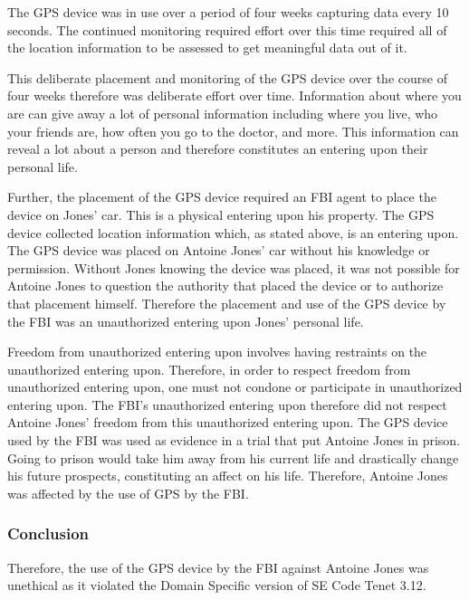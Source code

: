 \documentclass[12pt]{article}
\newcounter{subsubsubsection}[subsubsection]
\begin{document}
\begin{multicols}{2}
The GPS device was in use over a period of four weeks capturing data every 10 seconds. \cite{effjones} 
The continued monitoring required effort over this time required all of the location information to be assessed to get meaningful data out of it.

This deliberate placement and monitoring of the GPS device over the course of four weeks therefore was deliberate effort over time.
Information about where you are can give away a lot of personal information including where you live, who your friends are, how often you go to the doctor, and more. \cite{aclu_privacy}
This information can reveal a lot about a person and therefore constitutes an entering upon their personal life.

Further, the placement of the GPS device required an FBI agent to place the device on Jones' car. \cite{usvjonesopinions} This is a physical entering upon his property.
The GPS device collected location information which, as stated above, is an entering upon.
The GPS device was placed on Antoine Jones' car without his knowledge or permission. \cite{usvjonesopinions}
Without Jones knowing the device was placed, it was not possible for Antoine Jones to question the authority that placed the device or to authorize that placement himself.
Therefore the placement and use of the GPS device by the FBI was an unauthorized entering upon Jones' personal life.

Freedom from unauthorized entering upon involves having restraints on the unauthorized entering upon. Therefore, in order to respect freedom from unauthorized entering upon, one must not condone or participate in unauthorized entering upon.
The FBI's unauthorized entering upon therefore did not respect Antoine Jones' freedom from this unauthorized entering upon.
The GPS device used by the FBI was used as evidence in a trial that put Antoine Jones in prison. \cite{maynarddecision}
Going to prison would take him away from his current life and drastically change his future prospects, constituting an affect on his life.
Therefore, Antoine Jones was affected by the use of GPS by the FBI. 

\subsubsection{Conclusion}
Therefore, the use of the GPS device by the FBI against Antoine Jones was unethical as it violated the Domain Specific version of SE Code Tenet 3.12.


\end{multicols}
\end{document}
